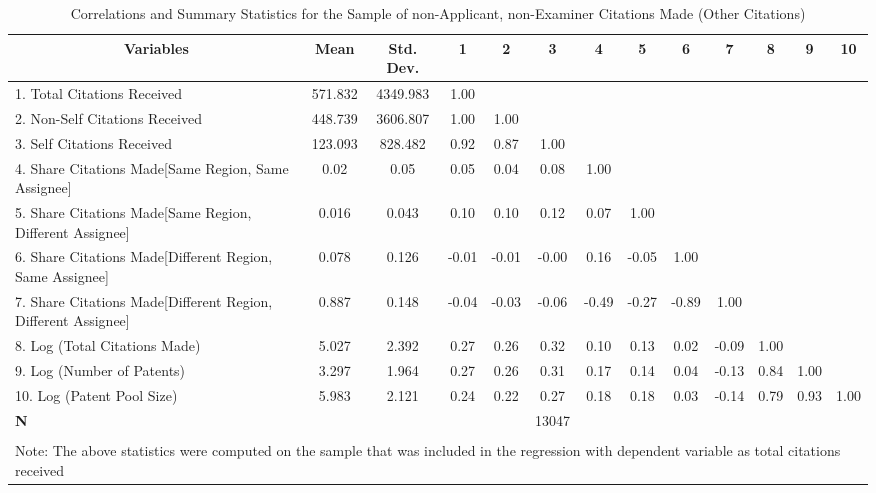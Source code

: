 \begin{sidewaystable}[htbp]\centering \caption{Correlations and Summary Statistics for the Sample of non-Applicant, non-Examiner Citations Made (Other Citations) \label{o.tcorrelation}}
\footnotesize
\onehalfspacing
\begin{tabular}{l  c  c  c  c  c  c  c  c  c  c  c  c }\hline\hline
\multicolumn{1}{c}{Variables} & \textbf{Mean}& \textbf{Std. Dev.}&1&2&3&4&5&6&7&8&9&10\\ \hline
1. Total Citations Received& 571.832 & 4349.983&1.00\\
2. Non-Self Citations Received& 448.739 & 3606.807&1.00&1.00\\
3. Self Citations Received & 123.093 & 828.482&0.92&0.87&1.00\\
4. Share Citations Made[Same Region, Same Assignee] & 0.02 & 0.05&0.05&0.04&0.08&1.00\\
5. Share Citations Made[Same Region, Different Assignee]& 0.016 & 0.043&0.10&0.10&0.12&0.07&1.00\\
6. Share Citations Made[Different Region, Same Assignee]& 0.078 & 0.126&-0.01&-0.01&-0.00&0.16&-0.05&1.00\\
7. Share Citations Made[Different Region, Different Assignee]& 0.887 & 0.148&-0.04&-0.03&-0.06&-0.49&-0.27&-0.89&1.00\\
8. Log (Total Citations Made)& 5.027 & 2.392&0.27&0.26&0.32&0.10&0.13&0.02&-0.09&1.00\\
9. Log (Number of Patents)& 3.297 & 1.964&0.27&0.26&0.31&0.17&0.14&0.04&-0.13&0.84&1.00\\
10. Log (Patent Pool Size)& 5.983 & 2.121&0.24&0.22&0.27&0.18&0.18&0.03&-0.14&0.79&0.93&1.00\\
\hline
\textbf{N}&&&&&13047\\
\hline \hline \\
\multicolumn{13}{l}{\footnotesize Note: The above statistics were computed on the sample that was included in the regression with dependent variable as total citations received}\\
 \end{tabular}
\end{sidewaystable}
